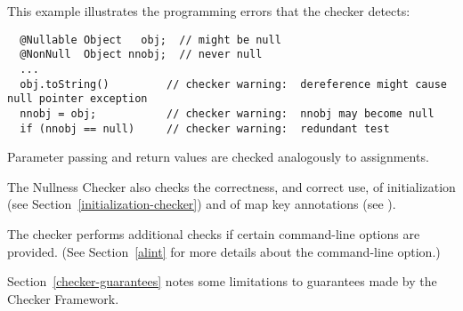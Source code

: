 This example illustrates the programming errors that the checker detects:

\begin{Verbatim}
  @Nullable Object   obj;  // might be null
  @NonNull  Object nnobj;  // never null
  ...
  obj.toString()         // checker warning:  dereference might cause null pointer exception
  nnobj = obj;           // checker warning:  nnobj may become null
  if (nnobj == null)     // checker warning:  redundant test
\end{Verbatim}

Parameter passing and return values are checked analogously to assignments.

The Nullness Checker also checks the correctness, and correct use, of
initialization (see
Section~\ref{initialization-checker}) and of map key annotations (see
).


The checker performs additional checks if certain 
command-line options are provided.  (See
Section~\ref{alint} for more details about the 
command-line option.)

Section~\ref{checker-guarantees} notes some limitations to guarantees made
by the Checker Framework.



